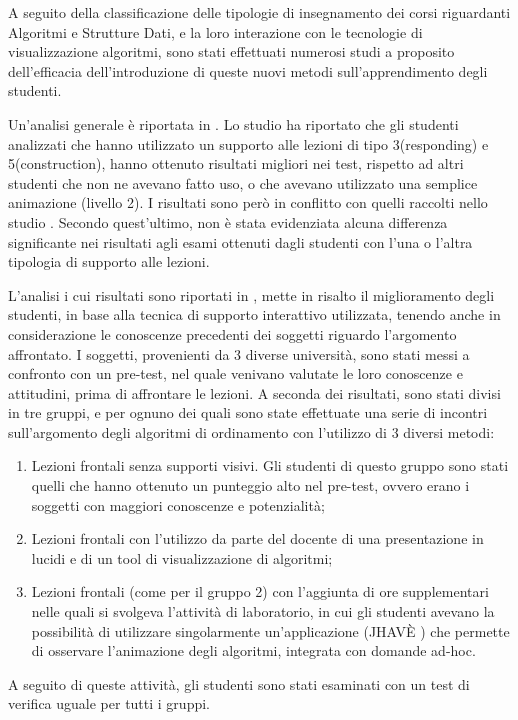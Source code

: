 A seguito della classificazione delle tipologie di insegnamento dei
corsi riguardanti Algoritmi e Strutture Dati, e la loro interazione
con le tecnologie di visualizzazione algoritmi, sono stati effettuati
numerosi studi a proposito dell'efficacia dell'introduzione di queste
nuovi metodi sull'apprendimento degli studenti.

Un'analisi generale è riportata in \cite{AV-compare}. Lo studio \cite{byrne}
ha riportato che gli studenti analizzati che hanno utilizzato un supporto
alle lezioni di tipo 3(responding) e 5(construction), hanno ottenuto
risultati migliori nei test, rispetto ad altri studenti che non ne
avevano fatto uso, o che avevano utilizzato una semplice animazione
(livello 2). I risultati sono però in conflitto con quelli raccolti
nello studio \cite{jarc}. Secondo quest'ultimo, non è stata evidenziata
alcuna differenza significante nei risultati agli esami ottenuti dagli
studenti con l'una o l'altra tipologia di supporto alle lezioni.

L'analisi i cui risultati sono riportati in \cite{AV-compare}, mette
in risalto il miglioramento degli studenti, in base alla tecnica di
supporto interattivo utilizzata, tenendo anche in considerazione le
conoscenze precedenti dei soggetti riguardo l'argomento affrontato.
I soggetti, provenienti da 3 diverse università, sono stati messi
a confronto con un pre-test, nel quale venivano valutate le loro conoscenze
e attitudini, prima di affrontare le lezioni. A seconda dei risultati,
sono stati divisi in tre gruppi, e per ognuno dei quali sono state
effettuate una serie di incontri sull'argomento degli algoritmi di
ordinamento con l'utilizzo di 3 diversi metodi: 
\begin{enumerate}
\item Lezioni frontali senza supporti visivi. Gli studenti di questo gruppo
sono stati quelli che hanno ottenuto un punteggio alto nel pre-test,
ovvero erano i soggetti con maggiori conoscenze e potenzialità;
\item Lezioni frontali con l'utilizzo da parte del docente di una presentazione
in lucidi e di un tool di visualizzazione di algoritmi;
\item Lezioni frontali (come per il gruppo 2) con l'aggiunta di ore supplementari
nelle quali si svolgeva l'attività di laboratorio, in cui gli studenti
avevano la possibilità di utilizzare singolarmente un'applicazione
(JHAVÈ \cite{JHAVE}) che permette di osservare l'animazione degli
algoritmi, integrata con domande ad-hoc. 
\end{enumerate}
A seguito di queste attività, gli studenti sono stati esaminati con
un test di verifica uguale per tutti i gruppi.


